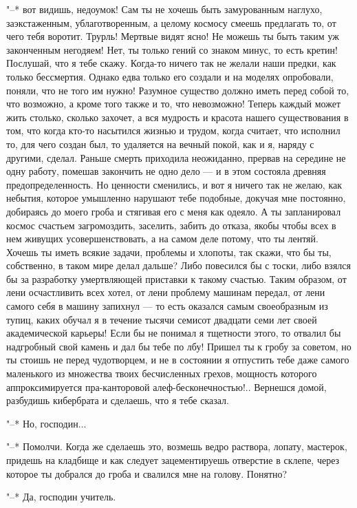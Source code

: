 "--* вот видишь, недоумок! Сам ты не хочешь быть
замурованным наглухо, заэкстаженным, ублаготворенным, а
целому космосу смеешь предлагать то, от чего тебя воротит.
Трурль! Мертвые видят ясно! Не можешь ты быть таким уж
законченным негодяем! Нет, ты только гений со знаком минус,
то есть кретин! Послушай, что я тебе скажу. Когда-то ничего
так не желали наши предки, как только бессмертия. Однако
едва только его создали и на моделях опробовали, поняли, что
не того им нужно! Разумное существо должно иметь перед собой
то, что возможно, а кроме того также и то, что невозможно!
Теперь каждый может жить столько, сколько захочет, а вся
мудрость и красота нашего существования в том, что когда
кто-то насытился жизнью и трудом, когда считает, что
исполнил то, для чего создан был, то удаляется на вечный
покой, как и я, наряду с другими, сделал. Раньше смерть
приходила неожиданно, прервав на середине не одну работу,
помешав закончить не одно дело --- и в этом состояла древняя
предопределенность. Но ценности сменились, и вот я ничего
так не желаю, как небытия, которое умышленно нарушают тебе
подобные, докучая мне постоянно, добираясь до моего гроба и
стягивая его с меня как одеяло. А ты запланировал космос
счастьем загромоздить, заселить, забить до отказа, якобы
чтобы всех в нем живущих усовершенствовать, а на самом деле
потому, что ты лентяй. Хочешь ты иметь всякие задачи,
проблемы и хлопоты, так скажи, что бы ты, собственно, в
таком мире делал дальше? Либо повесился бы с тоски, либо
взялся бы за разработку умертвляющей приставки к такому
счастью. Таким образом, от лени осчастливить всех хотел, от
лени проблему машинам передал, от лени самого себя в машину
запихнул --- то есть оказался самым своеобразным из тупиц,
каких обучал я в течение тысячи семисот двадцати семи лет
своей академической карьеры! Если бы не понимал я тщетности
этого, то отвалил бы надгробный свой камень и дал бы тебе по
лбу! Пришел ты к гробу за советом, но ты стоишь не перед
чудотворцем, и не в состоянии я отпустить тебе даже самого
маленького из множества твоих бесчисленных грехов, мощность
которого аппроксимируется пра-канторовой
алеф-бесконечностью!.. Вернешся домой, разбудишь кибербрата
и сделаешь, что я тебе сказал.

"--* Но, господин...

"--* Помолчи. Когда же сделаешь это, возмешь ведро
раствора, лопату, мастерок, придешь на кладбище и как
следует зацементируешь отверстие в склепе, через которое ты
добрался до гроба и свалился мне на голову. Понятно?

"--* Да, господин учитель.

